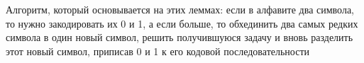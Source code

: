 \documentclass[discrete.tex]{subfiles}
\begin{document}
\begin{sol}
    Алгоритм, который основывается на этих леммах: если в алфавите два символа, то нужно закодировать их 0 и 1, а если больше, то обхединить два самых редких символа в один новый символ, решить получившуюся задачу и вновь разделить этот новый символ, приписав 0 и 1 к его кодовой последовательности
  \end{sol}

\end{document}
